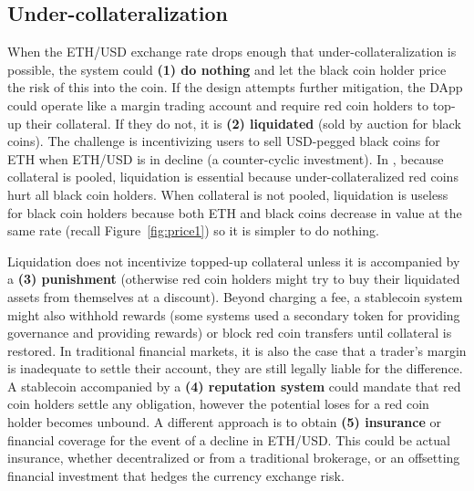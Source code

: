 
\subsection{Under-collateralization}

When the ETH/USD exchange rate drops enough that under-collateralization is possible, the system could \textbf{(1) do nothing} and let the black coin holder price the risk of this into the coin. If the design attempts further mitigation, the DApp could operate like a margin trading account and require red coin holders to top-up their collateral. If they do not, it is \textbf{(2) liquidated} (\eg sold by auction for black coins). The challenge is incentivizing users to sell USD-pegged black coins for ETH when ETH/USD is in decline (a counter-cyclic investment). In \dai, because collateral is pooled, liquidation is essential because under-collateralized red coins hurt all black coin holders. When collateral is not pooled, liquidation is useless for black coin holders because both ETH and black coins decrease in value at the same rate (recall Figure~\ref{fig:price1}) so it is simpler to do nothing.

Liquidation does not incentivize topped-up collateral unless it is accompanied by a \textbf{(3) punishment} (otherwise red coin holders might try to buy their liquidated assets from themselves at a discount). Beyond charging a fee, a stablecoin system might also withhold rewards (some systems used a secondary token for providing governance and providing rewards) or block red coin transfers until collateral is restored. In traditional financial markets, it is also the case that a trader's margin is inadequate to settle their account, they are still legally liable for the difference. A stablecoin accompanied by a \textbf{(4) reputation system} could mandate that red coin holders settle any obligation, however the potential loses for a red coin holder becomes unbound. A different approach is to obtain \textbf{(5) insurance} or financial coverage for the event of a decline in ETH/USD. This could be actual insurance, whether decentralized or from a traditional brokerage, or an offsetting financial investment that hedges the currency exchange risk. %

